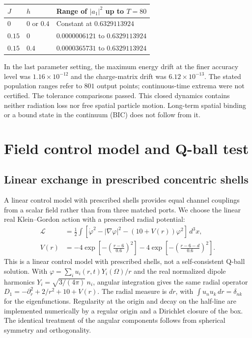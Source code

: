 \documentclass[a4paper,11pt]{article}
\newenvironment{drafttable}{\begin{center}\small\renewcommand{\arraystretch}{1.2}}{\end{center}}
\begin{document}
\begin{drafttable}
\begin{tabular}{@{}lll@{}}\toprule
$J$ & $h$ & Range of $|a_1|^2$ up to $T=80$\\\midrule
$0$ & $0$ or $0.4$ & Constant at $0.6329113924$\\
$0.15$ & $0$ & $0.0000006121$ to $0.6329113924$\\
$0.15$ & $0.4$ & $0.0000365731$ to $0.6329113924$\\\bottomrule
\end{tabular}
\end{drafttable}
In the last parameter setting, the maximum energy drift at the finer accuracy level was $1.16\times10^{-12}$ and the charge-matrix drift was $6.12\times10^{-13}$. The stated population ranges refer to $801$ output points; continuous-time extrema were not certified. The tolerance comparisons passed. This closed dynamics contains neither radiation loss nor free spatial particle motion. Long-term spatial binding or a bound state in the continuum (BIC) does not follow from it.

\section{Field control model and Q-ball test}\label{sec:field}
\subsection{Linear exchange in prescribed concentric shells}\label{sec:shells}
A linear control model with prescribed shells provides equal channel couplings from a scalar field rather than from three matched ports. We choose the linear real Klein--Gordon action with a prescribed radial potential:
\begin{equation}\label{eq:kg}
\begin{aligned}
\mathcal L&=\frac12\int[\dot\varphi^2-|\nabla\varphi|^2-(10+V(r))\varphi^2]\,d^3x,\\
V(r)&=-4\exp\left[-\left(\frac{r-6}{0.6}\right)^2\right]
-4\exp\left[-\left(\frac{r-6-d}{0.6}\right)^2\right].
\end{aligned}
\end{equation}
This is a linear control model with prescribed shells, not a self-consistent Q-ball solution. With $\varphi=\sum_i u_i(r,t)Y_i(\Omega)/r$ and the real normalized dipole harmonics $Y_i=\sqrt{3/(4\pi)}\,n_i$, angular integration gives the same radial operator $D_1=-\partial_r^2+2/r^2+10+V(r)$. The radial measure is $dr$, with $\int u_nu_k\,dr=\delta_{nk}$ for the eigenfunctions. Regularity at the origin and decay on the half-line are implemented numerically by a regular origin and a Dirichlet closure of the box. The identical treatment of the angular components follows from spherical symmetry and orthogonality.
\end{document}
